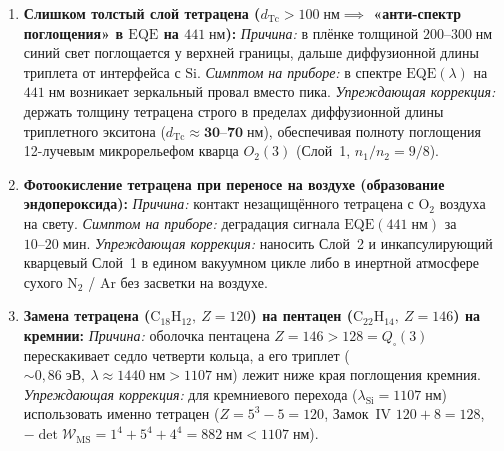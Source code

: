 \documentclass[11pt,a4paper]{article}
\theoremstyle{plain}
\theoremstyle{definition}
\begin{document}
\begin{enumerate}[label=\textbf{(F\arabic*)},leftmargin=*,noitemsep]
\item \textbf{Слишком толстый слой тетрацена ($d_{\mathrm{Tc}} > 100\;\text{нм} \implies$ «анти-спектр поглощения» в $\mathrm{EQE}$ на $441\;\text{нм}$):}
  \emph{Причина:} в плёнке толщиной $200\text{--}300\;\text{нм}$ синий свет поглощается у верхней границы, дальше диффузионной длины триплета от интерфейса с $\mathrm{Si}$.
  \emph{Симптом на приборе:} в спектре $\mathrm{EQE}(\lambda)$ на $441\;\text{нм}$ возникает зеркальный провал вместо пика.
  \emph{Упреждающая коррекция:} держать толщину тетрацена строго в пределах диффузионной длины триплетного экситона ($d_{\mathrm{Tc}} \approx \mathbf{30\text{--}70\;\text{нм}}$), обеспечивая полноту поглощения 12-лучевым микрорельефом кварца $O_2(3)$ (Слой~1, $n_1/n_2=9/8$).
\item \textbf{Фотоокисление тетрацена при переносе на воздухе (образование эндопероксида):}
  \emph{Причина:} контакт незащищённого тетрацена с $\mathrm{O_2}$ воздуха на свету.
  \emph{Симптом на приборе:} деградация сигнала $\mathrm{EQE}(441\;\text{нм})$ за $10\text{--}20\;\text{мин}$.
  \emph{Упреждающая коррекция:} наносить Слой~2 и инкапсулирующий кварцевый Слой~1 в едином вакуумном цикле либо в инертной атмосфере сухого $\mathrm{N_2}$ / $\mathrm{Ar}$ без засветки на воздухе.
\item \textbf{Замена тетрацена ($\mathrm{C_{18}H_{12}},\ Z=120$) на пентацен ($\mathrm{C_{22}H_{14}},\ Z=146$) на кремнии:}
  \emph{Причина:} оболочка пентацена $Z=146 > 128 = Q_\square(3)$ перескакивает седло четверти кольца, а его триплет ($\sim 0{,}86\;\text{эВ},\ \lambda\approx 1440\;\text{нм} > 1107\;\text{нм}$) лежит ниже края поглощения кремния.
  \emph{Упреждающая коррекция:} для кремниевого перехода ($\lambda_{\mathrm{Si}}=1107\;\text{нм}$) использовать именно тетрацен ($Z = 5^3 - 5 = 120$, Замок~IV $120 + 8 = 128$, $-\det\mathcal{W}_{\mathrm{MS}} = 1^4+5^4+4^4 = 882\;\text{нм} < 1107\;\text{нм}$).
\end{enumerate}
\end{document}

